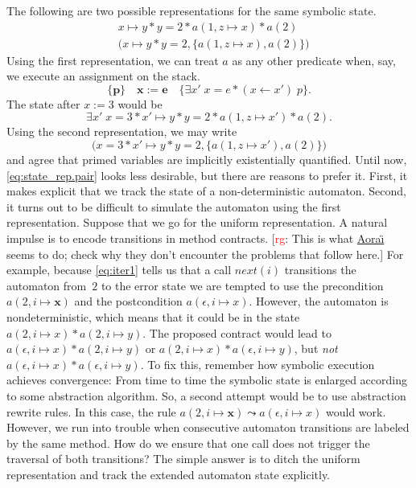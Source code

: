 \documentclass[a4paper]{article}
\newcommand{\rg}[1]{\todo{rg}{#1}}
\newcommand{\todo}[2]{{\small [\textcolor{red}{#1}: #2]}}
\theoremstyle{slanted}
\theoremstyle{definition}
\theoremstyle{remark}
\begin{document}
The following are two possible representations for the same symbolic state.
\begin{align}
& x\mapsto y * y = 2 * a(1, z\mapsto x) * a(2) 
  \label{eq:state_rep.star} \\
& \bigl(x\mapsto y * y = 2, \{a(1,z\mapsto x), a(2)\}\bigr)
  \label{eq:state_rep.pair}
\end{align}
Using the first representation, we can treat $a$ as any other predicate when, say, we execute an assignment on the stack.
  \[ \{\mathbf p\}\quad
  \mathbf x:=\mathbf e
  \quad\{\exists x'\;x=e * (x\gets x')\;p\}.\]
The state after $x:=3$ would be
  \[ \exists x'\; x = 3 * x'\mapsto y * y = 2 * a(1, z\mapsto x') * a(2). \]
Using the second representation, we may write
  \[ \bigl(x=3 * x'\mapsto y * y=2, \{a(1,z\mapsto x'), a(2)\}\bigr) \]
and agree that primed variables are implicitly existentially quantified.
Until now, \eqref{eq:state_rep.pair} looks less desirable, but there are reasons to prefer it. 
First, it makes explicit that we track the state of a non-deterministic automaton.
Second, it turns out to be difficult to simulate the automaton using the first representation.
Suppose that we go for the uniform representation.
A natural impulse is to encode transitions in method contracts.
\rg{This is what \href{http://amazones.gforge.inria.fr/aorai/aorai-manual.pdf}{Aora\"\i} seems to do; check why they don't encounter the problems that follow here.}
For example, because \eqref{eq:iter1} tells us that a call $\mathit{next}(i)$ transitions the automaton from~$2$ to the error state we are tempted to use the precondition $a(2,i\mapsto\mathbf{x})$ and the postcondition $a(\epsilon,i\mapsto x)$.
However, the automaton is nondeterministic, which means that it could be in the state $a(2,i\mapsto x) * a(2,i\mapsto y)$.
The proposed contract would lead to $a(\epsilon,i\mapsto x) * a(2,i\mapsto y)$ or $a(2,i\mapsto x) * a(\epsilon,i\mapsto y)$, but \emph{not} $a(\epsilon,i\mapsto x) * a(\epsilon,i\mapsto y)$.
To fix this, remember how symbolic execution achieves convergence:
From time to time the symbolic state is enlarged according to some abstraction algorithm.
So, a second attempt would be to use abstraction rewrite rules.
In this case, the rule $a(2,i\mapsto\mathbf{x})\leadsto a(\epsilon,i\mapsto x)$ would work.
However, we run into trouble when consecutive automaton transitions are labeled by the same method.
How do we ensure that one call does not trigger the traversal of both transitions?
The simple answer is to ditch the uniform representation and track the extended automaton state explicitly.
\end{document}
